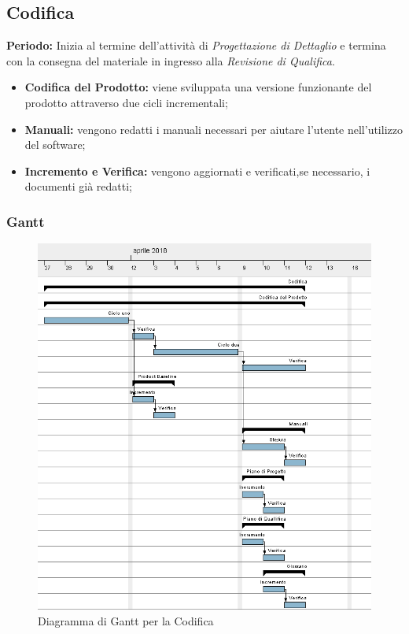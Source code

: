 \subsection{Codifica}
    \textbf{Periodo:}
    Inizia al termine dell'attività di \emph{Progettazione di Dettaglio} e termina con la consegna del materiale in ingresso alla \emph{Revisione di Qualifica}.
    \begin{itemize}
    	\item \textbf{Codifica del Prodotto:} viene sviluppata una versione funzionante del prodotto attraverso due cicli incrementali;
    	\item \textbf{Manuali:} vengono redatti i manuali necessari per aiutare l'utente nell'utilizzo del software;
    	\item \textbf{Incremento e Verifica:} vengono aggiornati e verificati,se necessario, i documenti già redatti;
    \end{itemize}
\subsubsection{Gantt}
\begin{figure}[H]
	\centering 
	\includegraphics[width=1\textwidth]{images/Codifica.png}
	\caption{Diagramma di Gantt per la Codifica}
	\label{graficobello5} 
\end{figure}
